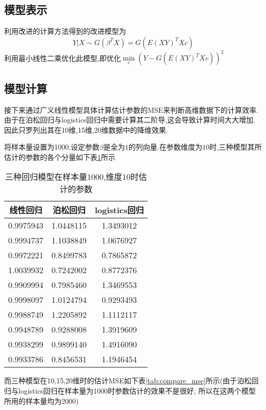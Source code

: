 \subsection{模型表示}
利用改进的计算方法得到的改进模型为
$$ Y|X \sim G(\beta^T X) = G(E(XY)^TXc)$$
利用最小线性二乘优化此模型,即优化$\min\limits_{c} (Y-G(E(XY)^TXc))^2$\\


\subsection{模型计算}
接下来通过广义线性模型具体计算估计参数的MSE来判断高维数据下的计算效率.由于在泊松回归与logistics回归中需要计算其二阶导,这会导致计算时间大大增加.
因此只罗列出其在10维,15维,20维数据中的降维效果.


将样本量设置为1000,设定参数$\beta$是全为$1$的列向量.在参数维度为$10$时,三种模型其所估计的参数的各个分量如下表\ref{tab:compare}所示
\begin{table}[htbp]
    \centering
    \caption{三种回归模型在样本量1000,维度10时估计的参数}
    \label{tab:compare}
    \begin{tabular}{c|c|c}
    \hline
    线性回归      & 泊松回归      & logistics回归 \\ \hline
    0.9975943 & 1.0448115 & 1.3493012   \\ \hline
    0.9994737 & 1.1038849 & 1.0676927   \\ \hline
    0.9972221 & 0.8499783 & 0.7865872   \\ \hline
    1.0039932 & 0.7242002 & 0.8772376   \\ \hline
    0.9909994 & 0.7985460 & 1.3469553   \\ \hline
    0.9998097 & 1.0124794 & 0.9293493   \\ \hline
    0.9988749 & 1.2205892 & 1.1112117   \\ \hline
    0.9948789 & 0.9288008 & 1.3919609   \\ \hline
    0.9938299 & 0.9899140 & 1.4916090   \\ \hline
    0.9933786 & 0.8456531 & 1.1946454   \\ \hline
    \end{tabular}
\end{table}

而三种模型在10,15,20维时的估计MSE如下表\ref{tab:compare_mse}所示(由于泊松回归与logistics回归在样本量为1000时参数估计的效果不是很好,
所以在这两个模型所用的样本量均为2000)

